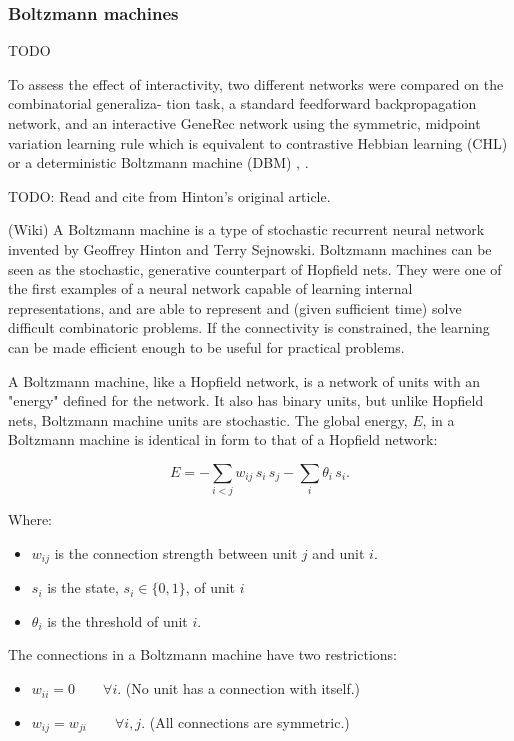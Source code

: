 \subsubsection{Boltzmann machines}
TODO \cite{ackley1985learning}


To assess the effect of interactivity, two different networks were compared on the combinatorial generaliza-
tion task, a standard feedforward backpropagation network, and an interactive GeneRec network using the
symmetric, midpoint variation learning rule which is equivalent to contrastive Hebbian learning (CHL) or a
deterministic Boltzmann machine (DBM) \cite{o1996bio}, \cite{o2001generalization}. 

TODO: Read and cite from Hinton's original article. 

(Wiki) A Boltzmann machine is a type of stochastic recurrent neural network invented by Geoffrey Hinton and Terry Sejnowski. Boltzmann machines can be seen as the stochastic, generative counterpart of Hopfield nets. They were one of the first examples of a neural network capable of learning internal representations, and are able to represent and (given sufficient time) solve difficult combinatoric problems. If the connectivity is constrained, the learning can be made efficient enough to be useful for practical problems.

A Boltzmann machine, like a Hopfield network, is a network of units with an "energy" defined for the network. It also has binary units, but unlike Hopfield nets, Boltzmann machine units are stochastic. The global energy, $E$, in a Boltzmann machine is identical in form to that of a Hopfield network:

$$E = -\sum_{i<j} w_{ij} \, s_i \, s_j - \sum_i \theta_i \, s_i.$$

Where:
\begin{itemize}
    \item $w_{ij}$ is the connection strength between unit $j$ and unit $i$.
    \item $s_i$ is the state, $s_i \in \{0,1\}$, of unit $i$
    \item $\theta_i$ is the threshold of unit $i$.
\end{itemize}

The connections in a Boltzmann machine have two restrictions:
\begin{itemize}
    \item $w_{ii}=0\qquad \forall i$. (No unit has a connection with itself.)
    \item $w_{ij}=w_{ji}\qquad \forall i,j$. (All connections are symmetric.)
\end{itemize}


